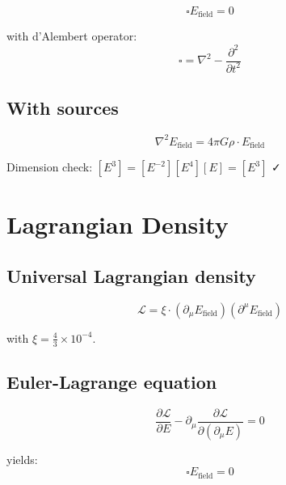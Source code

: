 	\begin{equation}
		\square E_{\text{field}} = 0
	\end{equation}
	
	with d'Alembert operator:
	\begin{equation}
		\square = \nabla^2 - \frac{\partial^2}{\partial t^2}
	\end{equation}
	
	\subsection{With sources}
	
	\begin{equation}
		\nabla^2 E_{\text{field}} = 4\pi G \rho \cdot E_{\text{field}}
	\end{equation}
	
	Dimension check: $[E^3] = [E^{-2}][E^4][E] = [E^3]$ ✓
	
	\section{Lagrangian Density}
	\label{sec:lagrangian}
	
	\subsection{Universal Lagrangian density}
	
	\begin{equation}
		\mathcal{L} = \xi \cdot (\partial_\mu E_{\text{field}})(\partial^\mu E_{\text{field}})
	\end{equation}
	
	with $\xi = \frac{4}{3} \times 10^{-4}$.
	
	\subsection{Euler-Lagrange equation}
	
	\begin{equation}
		\frac{\partial \mathcal{L}}{\partial E} - \partial_\mu \frac{\partial \mathcal{L}}{\partial(\partial_\mu E)} = 0
	\end{equation}
	
	yields:
	\begin{equation}
		\square E_{\text{field}} = 0
	\end{equation}
	
